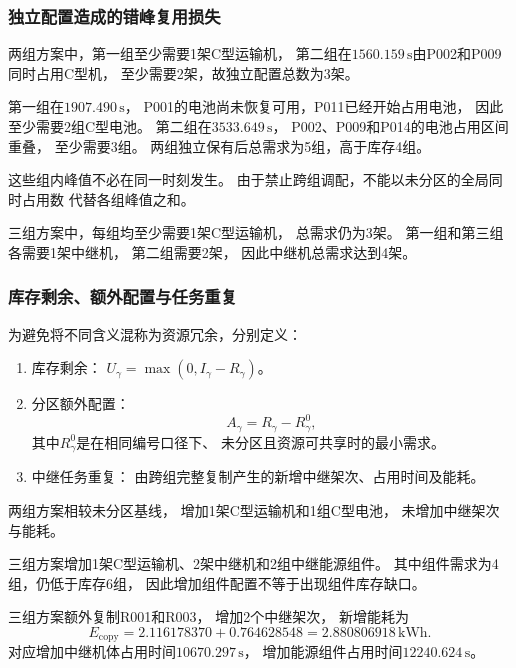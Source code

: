 \documentclass[bwprint]{gmcmthesis}
\begin{document}
\subsubsection{独立配置造成的错峰复用损失}

两组方案中，第一组至少需要1架C型运输机，
第二组在$1560.159\,\mathrm{s}$由P002和P009同时占用C型机，
至少需要2架，故独立配置总数为3架。

第一组在$1907.490\,\mathrm{s}$，
P001的电池尚未恢复可用，P011已经开始占用电池，
因此至少需要2组C型电池。
第二组在$3533.649\,\mathrm{s}$，
P002、P009和P014的电池占用区间重叠，
至少需要3组。
两组独立保有后总需求为5组，高于库存4组。

这些组内峰值不必在同一时刻发生。
由于禁止跨组调配，不能以未分区的全局同时占用数
代替各组峰值之和。

三组方案中，每组均至少需要1架C型运输机，
总需求仍为3架。
第一组和第三组各需要1架中继机，
第二组需要2架，
因此中继机总需求达到4架。

\subsubsection{库存剩余、额外配置与任务重复}

为避免将不同含义混称为资源冗余，分别定义：

\begin{enumerate}
    \item 库存剩余：
    $U_\gamma=\max(0,I_\gamma-R_\gamma)$。

    \item 分区额外配置：
    \begin{equation}
    A_\gamma=R_\gamma-R_\gamma^0,
    \end{equation}
    其中$R_\gamma^0$是在相同编号口径下、
    未分区且资源可共享时的最小需求。

    \item 中继任务重复：
    由跨组完整复制产生的新增中继架次、占用时间及能耗。
\end{enumerate}

两组方案相较未分区基线，
增加1架C型运输机和1组C型电池，
未增加中继架次与能耗。

三组方案增加1架C型运输机、2架中继机和2组中继能源组件。
其中组件需求为4组，仍低于库存6组，
因此增加组件配置不等于出现组件库存缺口。

三组方案额外复制R001和R003，
增加2个中继架次，
新增能耗为
\begin{equation}
E_{\mathrm{copy}}
=
2.116178370+0.764628548
=
2.880806918\,\mathrm{kWh}.
\end{equation}
对应增加中继机体占用时间$10670.297\,\mathrm{s}$，
增加能源组件占用时间$12240.624\,\mathrm{s}$。
\end{document}
